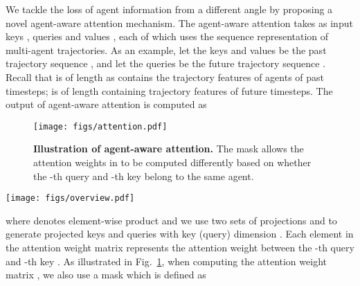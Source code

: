 \documentclass[10pt,twocolumn,letterpaper]{article}
\newcommand{\mname}{AgentFormer}
\begin{document}
We tackle the loss of agent information from a different angle by proposing a novel agent-aware attention mechanism. The agent-aware attention takes as input keys , queries  and values , each of which uses the sequence representation of multi-agent trajectories. As an example, let the keys  and values  be the past trajectory sequence , and let the queries  be the future trajectory sequence . Recall that  is of length  as  contains the trajectory features of  agents of  past timesteps;  is of length  containing trajectory features of  future timesteps. The output of agent-aware attention is computed as

\vspace{-3mm}
\begin{small}

\vspace{-3mm}
\end{small}

\begin{figure}
    \centering
    \texttt{[image: figs/attention.pdf]}
    \caption{\textbf{Illustration of agent-aware attention.} The mask  allows the attention weights in  to be computed differently based on whether the -th query and -th key belong to the same agent. }
    \label{fig:attention}
    \vspace{-2mm}
\end{figure}

\begin{figure*}[ht]
    \centering
    \texttt{[image: figs/overview.pdf]}
    \caption{\textbf{Overview of our \mname-based multi-agent trajectory prediction framework.}}
    \label{fig:overview}
    \vspace{-2mm}
\end{figure*}

\noindent where  denotes element-wise product and we use two sets of projections  and  to generate projected keys  and queries  with key (query) dimension . Each element  in the attention weight matrix  represents the attention weight between the -th query  and \mbox{-th} key . As illustrated in Fig.~\ref{fig:attention}, when computing the attention weight matrix , we also use a mask  which is defined as
\end{document}

